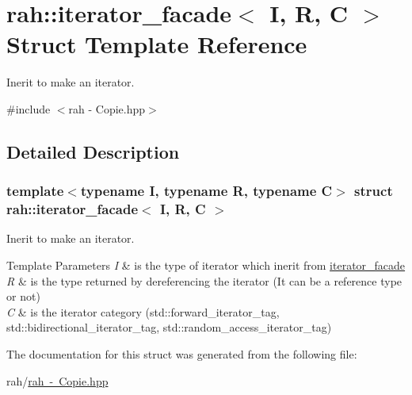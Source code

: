 \hypertarget{structrah_1_1iterator__facade}{}\section{rah\+::iterator\+\_\+facade$<$ I, R, C $>$ Struct Template Reference}
\label{structrah_1_1iterator__facade}


Inerit to make an iterator.  




{\ttfamily \#include $<$rah -\/ Copie.\+hpp$>$}



\subsection{Detailed Description}
\subsubsection*{template$<$typename I, typename R, typename C$>$\newline
struct rah\+::iterator\+\_\+facade$<$ I, R, C $>$}

Inerit to make an iterator. 


\begin{DoxyTemplParams}{Template Parameters}
{\em I} & is the type of iterator which inerit from \mbox{\hyperlink{structrah_1_1iterator__facade}{iterator\+\_\+facade}} \\
\hline
{\em R} & is the type returned by dereferencing the iterator (It can be a reference type or not) \\
\hline
{\em C} & is the iterator category (std\+::forward\+\_\+iterator\+\_\+tag, std\+::bidirectional\+\_\+iterator\+\_\+tag, std\+::random\+\_\+access\+\_\+iterator\+\_\+tag) \\
\hline
\end{DoxyTemplParams}


The documentation for this struct was generated from the following file\+:\begin{DoxyCompactItemize}
\item 
rah/\mbox{\hyperlink{rah_01-_01_copie_8hpp}{rah -\/ Copie.\+hpp}}\end{DoxyCompactItemize}
